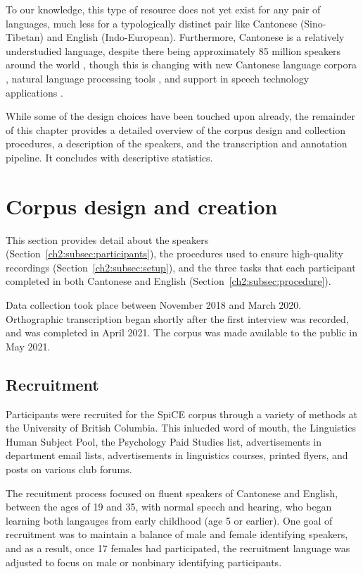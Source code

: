 To our knowledge, this type of resource does not yet exist for any pair of languages, much less for a typologically distinct pair like Cantonese (Sino-Tibetan) and English (Indo-European). Furthermore, Cantonese is a relatively understudied language, despite there being approximately 85 million speakers around the world \citep{ethnologue_yue_2021}, though this is changing with new Cantonese language corpora \citep{luke_2015_hkc,leung_2001_hkcac, winterstein_2020_cantomap,alderete_2019_tone}, natural language processing tools \citep{lee_2018_pycantonese,yau_2019_pyjyutping}, and support in speech technology applications \citep{google_2019_stt}.

While some of the design choices have been touched upon already, the remainder of this chapter provides a detailed overview of the corpus design and collection procedures, a description of the speakers, and the transcription and annotation pipeline. It concludes with descriptive statistics. 

\section{Corpus design and creation}\label{ch2:sec:design}

This section provides detail about the speakers (Section~\ref{ch2:subsec:participants}), the procedures used to ensure high-quality recordings (Section~\ref{ch2:subsec:setup}), and the three tasks that each participant completed in both Cantonese and English (Section~\ref{ch2:subsec:procedure}). 

Data collection took place between November 2018 and March 2020. Orthographic transcription began shortly after the first interview was recorded, and was completed in April 2021. The corpus was made available to the public in May 2021.

\subsection{Recruitment}

Participants were recruited for the SpiCE corpus through a variety of methods at the University of British Columbia. This inlucded word of mouth, the Linguistics Human Subject Pool, the Psychology Paid Studies list, advertisements in department email lists, advertisements in linguistics courses, printed flyers, and posts on various club forums. 

The recuitment process focused on fluent speakers of Cantonese and English, between the ages of 19 and 35, with normal speech and hearing, who began learning both langauges from early childhood (age 5 or earlier). One goal of recruitment was to maintain a balance of male and female identifying speakers, and as a result, once 17 females had participated, the recruitment language was adjusted to focus on male or nonbinary identifying participants.

